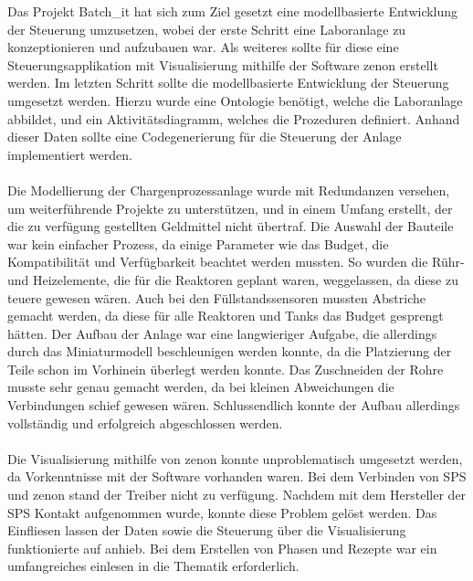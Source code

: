 Das Projekt Batch\_it hat sich zum Ziel gesetzt eine modellbasierte Entwicklung der Steuerung umzusetzen, wobei der erste Schritt eine Laboranlage zu konzeptionieren und aufzubauen war. Als weiteres sollte für diese eine Steuerungsapplikation mit Visualisierung mithilfe der Software zenon erstellt werden. Im letzten Schritt sollte die modellbasierte Entwicklung der Steuerung umgesetzt werden. Hierzu wurde eine Ontologie benötigt, welche die Laboranlage abbildet, und ein Aktivitätsdiagramm, welches die Prozeduren definiert. Anhand dieser Daten sollte eine Codegenerierung für die Steuerung der Anlage implementiert werden. \\\\
Die Modellierung der Chargenprozessanlage wurde mit Redundanzen versehen, um weiterführende Projekte zu unterstützen, und in einem Umfang erstellt, der die zu verfügung gestellten Geldmittel nicht übertraf. 
Die Auswahl der Bauteile war kein einfacher Prozess, da einige Parameter wie das Budget, die Kompatibilität und Verfügbarkeit beachtet werden mussten. So wurden die Rühr- und Heizelemente, die für die Reaktoren geplant waren, weggelassen, da diese zu teuere gewesen wären. Auch bei den Füllstandssensoren mussten Abstriche gemacht werden, da diese für alle Reaktoren und Tanks das Budget gesprengt hätten.
Der Aufbau der Anlage war eine langwieriger Aufgabe, die allerdings durch das Miniaturmodell beschleunigen werden konnte, da die Platzierung der Teile schon im Vorhinein überlegt werden konnte. Das Zuschneiden der Rohre musste sehr genau gemacht werden, da bei kleinen Abweichungen die Verbindungen schief gewesen wären. Schlussendlich konnte der Aufbau allerdings vollständig und erfolgreich abgeschlossen werden. \\\\
Die Visualisierung mithilfe von zenon konnte unproblematisch umgesetzt werden, da Vorkenntnisse mit der Software vorhanden waren. Bei dem Verbinden von SPS und zenon stand der Treiber nicht zu verfügung. Nachdem mit dem Hersteller der SPS Kontakt aufgenommen wurde, konnte diese Problem gelöst werden. Das Einfliesen lassen der Daten sowie die Steuerung über die Visualisierung funktionierte auf anhieb. Bei dem Erstellen von Phasen und Rezepte war ein umfangreiches einlesen in die Thematik erforderlich.\\\\
